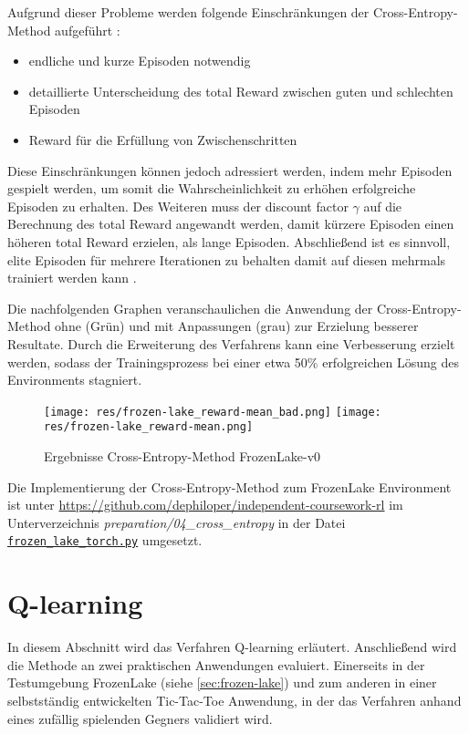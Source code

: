 \documentclass[11pt]{scrartcl}
\begin{document}
Aufgrund dieser Probleme werden folgende Einschränkungen der Cross-Entropy-Method 
aufgeführt \cite[~S.92 f.]{L2018}:
\begin{itemize}
\itemsep0pt
\item endliche und kurze Episoden notwendig
\item detaillierte Unterscheidung des total Reward zwischen guten und schlechten Episoden
\item Reward für die Erfüllung von Zwischenschritten
  \label{itm:cross_entropy_limits}
\end{itemize}

Diese Einschränkungen können jedoch adressiert werden, indem mehr Episoden gespielt werden,
um somit die Wahrscheinlichkeit zu erhöhen erfolgreiche Episoden zu erhalten. Des Weiteren
muss der discount factor $\gamma$ auf die Berechnung des total Reward angewandt werden, damit
kürzere Episoden einen höheren total Reward erzielen, als lange Episoden. Abschließend ist es
sinnvoll, elite Episoden für mehrere Iterationen zu behalten damit auf diesen mehrmals
trainiert werden kann \cite[~S.93]{L2018}.  

Die nachfolgenden Graphen veranschaulichen die Anwendung der Cross-Entropy-Method ohne (Grün)
und mit Anpassungen (grau) zur Erzielung besserer Resultate. Durch die Erweiterung des
Verfahrens kann eine Verbesserung erzielt werden, sodass der Trainingsprozess bei einer
etwa 50\% erfolgreichen Lösung des Environments stagniert.

\begin{figure}[htp]
\centering
\texttt{[image: res/frozen-lake\_reward-mean\_bad.png]}
\texttt{[image: res/frozen-lake\_reward-mean.png]}
\caption{Ergebnisse Cross-Entropy-Method FrozenLake-v0}
\label{fig:frozen-lake_cross-entropy}
\end{figure}

Die Implementierung der Cross-Entropy-Method zum FrozenLake Environment ist unter
\url{https://github.com/dephiloper/independent-coursework-rl} im Unterverzeichnis 
\textit{preparation/04\_cross\_entropy} in der Datei 
\href{https://github.com/dephiloper/independent-coursework-rl/blob/master/preparation/04_cross_entropy/frozen_lake_torch.py}{\nolinkurl{frozen\_lake\_torch.py}} umgesetzt.
\newpage


\section{Q-learning}
In diesem Abschnitt wird das Verfahren Q-learning erläutert. Anschließend wird die Methode
an zwei praktischen Anwendungen evaluiert. Einerseits in der Testumgebung FrozenLake
(siehe \autoref{sec:frozen-lake}) und zum anderen in einer selbstständig entwickelten
Tic-Tac-Toe Anwendung, in der das Verfahren anhand eines zufällig spielenden Gegners
validiert wird.
\end{document}

